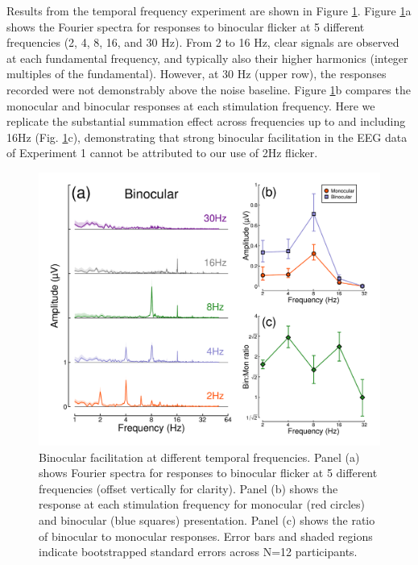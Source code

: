 \documentclass[
]{article}
\begin{document}
Results from the temporal frequency experiment are shown in Figure \ref{fig:TFdata}. Figure \ref{fig:TFdata}a shows the Fourier spectra for responses to binocular flicker at 5 different frequencies (2, 4, 8, 16, and 30 Hz). From 2 to 16 Hz, clear signals are observed at each fundamental frequency, and typically also their higher harmonics (integer multiples of the fundamental). However, at 30 Hz (upper row), the responses recorded were not demonstrably above the noise baseline. Figure \ref{fig:TFdata}b compares the monocular and binocular responses at each stimulation frequency. Here we replicate the substantial summation effect across frequencies up to and including 16Hz (Fig. \ref{fig:TFdata}c), demonstrating that strong binocular facilitation in the EEG data of Experiment 1 cannot be attributed to our use of 2Hz flicker.

\begin{figure}

{\centering \includegraphics{Figures/TFdata} 

}

\caption{Binocular facilitation at different temporal frequencies. Panel (a) shows Fourier spectra for responses to binocular flicker at 5 different frequencies (offset vertically for clarity). Panel (b) shows the response at each stimulation frequency for monocular (red circles) and binocular (blue squares) presentation. Panel (c) shows the ratio of binocular to monocular responses. Error bars and shaded regions indicate bootstrapped standard errors across N=12 participants.}\label{fig:TFdata}
\end{figure}
\end{document}
